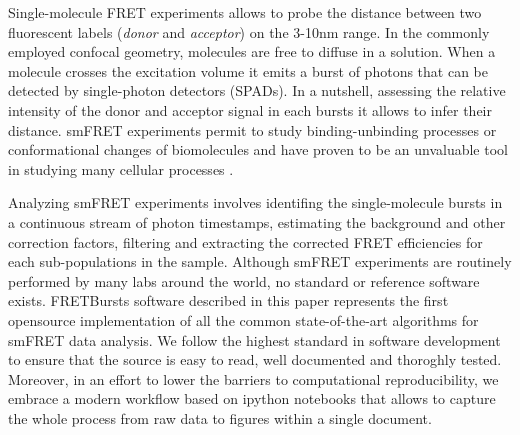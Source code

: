
Single-molecule FRET experiments allows to probe the distance between two fluorescent labels (\textit{donor} and \textit{acceptor}) on the 3-10nm range. In the commonly employed confocal geometry, molecules are free to diffuse in a solution. When a molecule crosses the excitation volume it emits a burst of photons that can be detected by single-photon detectors (SPADs). In a nutshell, assessing the relative intensity of the donor and acceptor signal in each bursts it allows to infer their distance. smFRET experiments permit to study binding-unbinding processes or conformational changes of biomolecules and have proven to be an unvaluable tool in studying many cellular processes \cite{Kapanidis_2006}.

Analyzing smFRET experiments involves identifing the single-molecule bursts in a continuous stream of photon timestamps, estimating the background and other correction factors, filtering and extracting the corrected FRET efficiencies for each sub-populations in the sample. Although smFRET experiments are routinely performed by many labs around the world, no standard or reference software exists. FRETBursts software described in this paper represents the first opensource implementation of all the common state-of-the-art algorithms for smFRET data analysis. We follow the highest standard in software development to ensure that the source is easy to read, well documented and thoroghly tested. Moreover, in an effort to lower the barriers to computational reproducibility, we embrace a modern workflow based on ipython notebooks that allows to capture the whole process from raw data to figures within a single document.
